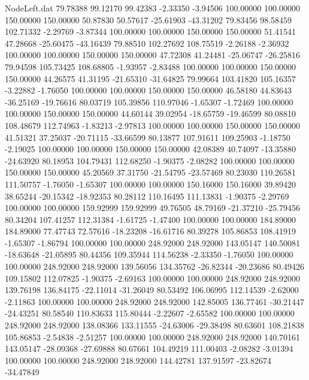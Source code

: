 \begin{filecontents}{NodeLeft.dat}
  79.78388   99.12170   99.42383    -2.33350   -3.94506  100.00000  100.00000  150.00000  150.00000   50.87830   50.57617  -25.61903  -43.31202
  79.83456   98.58459  102.71332    -2.29769   -3.87344  100.00000  100.00000  150.00000  150.00000   51.41541   47.28668  -25.60475  -43.16439
  79.88510  102.27692  108.75519    -2.26188   -2.36932  100.00000  100.00000  150.00000  150.00000   47.72308   41.24481  -25.06747  -26.25816
  79.94598  105.73425  108.68805    -1.93957   -2.83488  100.00000  100.00000  150.00000  150.00000   44.26575   41.31195  -21.65310  -31.64825
  79.99664  103.41820  105.16357    -3.22882   -1.76050  100.00000  100.00000  150.00000  150.00000   46.58180   44.83643  -36.25169  -19.76616
  80.03719  105.39856  110.97046    -1.65307   -1.72469  100.00000  100.00000  150.00000  150.00000   44.60144   39.02954  -18.65759  -19.46599
  80.08810  108.48679  112.74963    -1.83213   -2.97813  100.00000  100.00000  150.00000  150.00000   41.51321   37.25037  -20.71115  -33.66599
  80.13877  107.91611  109.25903    -1.18750   -2.19025  100.00000  100.00000  150.00000  150.00000   42.08389   40.74097  -13.35880  -24.63920
  80.18953  104.79431  112.68250    -1.90375   -2.08282  100.00000  100.00000  150.00000  150.00000   45.20569   37.31750  -21.54795  -23.57469
  80.23030  110.26581  111.50757    -1.76050   -1.65307  100.00000  100.00000  150.16000  150.16000   39.89420   38.65244  -20.15342  -18.92353
  80.28112  110.16495  111.13831    -1.90375   -2.29769  100.00000  100.00000  159.92999  159.92999   49.76505   48.79169  -21.37210  -25.79456
  80.34204  107.41257  112.31384    -1.61725   -1.47400  100.00000  100.00000  184.89000  184.89000   77.47743   72.57616  -18.23208  -16.61716
  80.39278  105.86853  108.41919    -1.65307   -1.86794  100.00000  100.00000  248.92000  248.92000  143.05147  140.50081  -18.63648  -21.05895
  80.44356  109.35944  114.56238    -2.33350   -1.76050  100.00000  100.00000  248.92000  248.92000  139.56056  134.35762  -26.82344  -20.23686
  80.49426  109.15802  112.07825    -1.90375   -2.69163  100.00000  100.00000  248.92000  248.92000  139.76198  136.84175  -22.11014  -31.26049
  80.53492  106.06995  112.14539    -2.62000   -2.11863  100.00000  100.00000  248.92000  248.92000  142.85005  136.77461  -30.21447  -24.43251
  80.58540  110.83633  115.80444    -2.22607   -2.65582  100.00000  100.00000  248.92000  248.92000  138.08366  133.11555  -24.63006  -29.38498
  80.63601  108.21838  105.86853    -2.54838   -2.51257  100.00000  100.00000  248.92000  248.92000  140.70161  143.05147  -28.09368  -27.69888
  80.67661  104.49219  111.00403    -2.08282   -3.01394  100.00000  100.00000  248.92000  248.92000  144.42781  137.91597  -23.82674  -34.47849

\end{filecontents}
